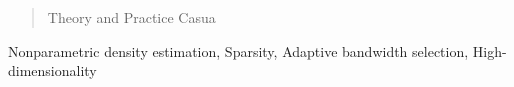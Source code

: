 \documentclass[twoside,11pt]{article}
\begin{document}


\begin{abstract}
Theory and Practice Casua\\
\end{abstract}

\begin{keywords}
  Nonparametric density estimation, Sparsity, Adaptive bandwidth selection, High-dimensionality
\end{keywords}





\vskip 0.2in

\end{document}
